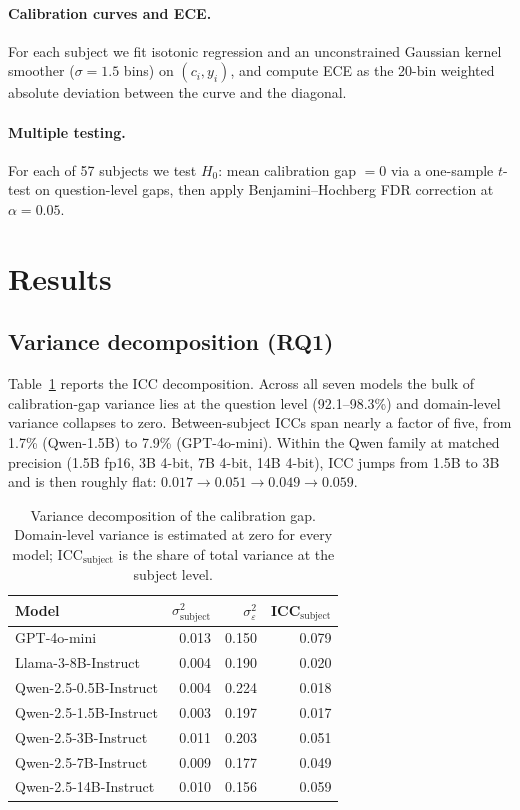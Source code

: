 \documentclass{article}
\begin{document}
\paragraph{Calibration curves and ECE.}
For each subject we fit isotonic regression \citep{zadrozny2002transforming}
and an unconstrained Gaussian kernel smoother ($\sigma=1.5$ bins) on
$(c_i, y_i)$, and compute ECE as the 20-bin weighted absolute deviation between
the curve and the diagonal.

\paragraph{Multiple testing.}
For each of 57 subjects we test $H_0$: mean calibration gap $= 0$ via a
one-sample $t$-test on question-level gaps, then apply Benjamini--Hochberg FDR
correction \citep{bh1995} at $\alpha = 0.05$.

\section{Results}

\subsection{Variance decomposition (RQ1)}

Table~\ref{tab:icc} reports the ICC decomposition. Across all seven models the
bulk of calibration-gap variance lies at the question level (92.1--98.3\%) and
domain-level variance collapses to zero. Between-subject ICCs span nearly a
factor of five, from 1.7\% (Qwen-1.5B) to 7.9\% (GPT-4o-mini). Within the Qwen
family at matched precision (1.5B fp16, 3B 4-bit, 7B 4-bit, 14B 4-bit), ICC
jumps from 1.5B to 3B and is then roughly flat:
$0.017 \to 0.051 \to 0.049 \to 0.059$.

\begin{table}[h]
\centering
\small
\caption{Variance decomposition of the calibration gap. Domain-level variance
is estimated at zero for every model; ICC$_\text{subject}$ is the share of
total variance at the subject level.}
\label{tab:icc}
\begin{tabular}{lrrr}
\toprule
Model & $\sigma^2_{\text{subject}}$ & $\sigma^2_\varepsilon$ & ICC$_{\text{subject}}$ \\
\midrule
GPT-4o-mini             & 0.013 & 0.150 & 0.079 \\
Llama-3-8B-Instruct     & 0.004 & 0.190 & 0.020 \\
Qwen-2.5-0.5B-Instruct  & 0.004 & 0.224 & 0.018 \\
Qwen-2.5-1.5B-Instruct  & 0.003 & 0.197 & 0.017 \\
Qwen-2.5-3B-Instruct    & 0.011 & 0.203 & 0.051 \\
Qwen-2.5-7B-Instruct    & 0.009 & 0.177 & 0.049 \\
Qwen-2.5-14B-Instruct   & 0.010 & 0.156 & 0.059 \\
\bottomrule
\end{tabular}
\end{table}
\end{document}
